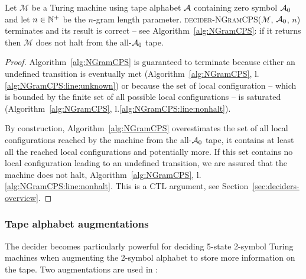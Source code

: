 \begin{theorem}\label{th:ngramcps}
    Let $\mathcal{M}$ be a Turing machine using tape alphabet $\mathcal{A}$ containing zero symbol $\mathcal{A}_0$ and let $n \in \mathbb{N}^+$ be the $n$-gram length parameter. \textsc{decider-NGramCPS}($\mathcal{M}$, $\mathcal{A}_0$, $n$) terminates and its result is correct -- see Algorithm~\ref{alg:NGramCPS}: if it returns \NONHALT then $\mathcal{M}$ does not halt from the all-$\mathcal{A}_0$ tape.
\end{theorem}
\begin{proof}
    Algorithm~\ref{alg:NGramCPS} is guaranteed to terminate because either an undefined transition is eventually met (Algorithm~\ref{alg:NGramCPS}, l.\ref{alg:NGramCPS:line:unknown}) or because the set of local configuration -- which is bounded by the finite set of all possible local configurations -- is saturated (Algorithm~\ref{alg:NGramCPS}, l.\ref{alg:NGramCPS:line:nonhalt}).

    By construction, Algorithm~\ref{alg:NGramCPS} overestimates the set of all local configurations reached by the machine from the all-$\mathcal{A}_0$ tape, \ie it contains at least all the reached local configurations and potentially more. If this set contains no local configuration leading to an undefined transition, we are assured that the machine does not halt, Algorithm~\ref{alg:NGramCPS}, l.\ref{alg:NGramCPS:line:nonhalt}. This is a CTL argument, see Section~\ref{sec:deciders-overview}.
\end{proof}



\subsubsection{Tape alphabet augmentations}\label{sec:n-gramCPS:augmentations}

The \ngramcps decider becomes particularly powerful for deciding 5-state 2-symbol Turing machines when augmenting the 2-symbol alphabet to store more information on the tape. Two augmentations are used in \CoqBB:


